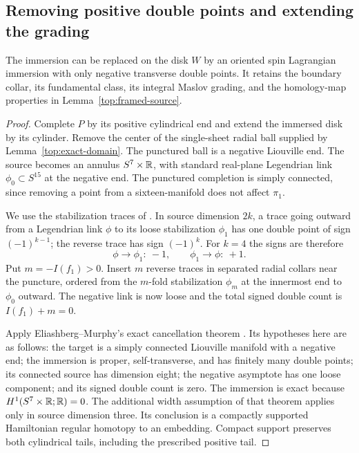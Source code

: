 \subsection{Removing positive double points and extending the grading}

\begin{lemma}\label{top:negative-doubles}
The immersion can be replaced on the disk $W$ by an oriented spin
Lagrangian immersion with only negative transverse double points.
It retains the boundary collar, its fundamental class, its integral
Maslov grading, and the homology-map properties in
Lemma~\ref{top:framed-source}.
\end{lemma}

\begin{proof}
Complete $P$ by its positive cylindrical end and extend the
immersed disk by its cylinder.  Remove the center of the
single-sheet radial ball supplied by Lemma~\ref{top:exact-domain}.
The punctured ball is a negative Liouville end.  The source
becomes an annulus $S^7\times\mathbb R$, with standard real-plane
Legendrian link $\phi_0\subset S^{15}$ at the negative end.
The punctured completion is simply connected, since removing
a point from a sixteen-manifold does not affect $\pi_1$.

We use the stabilization traces of
\cite[Lemma~3.2 and proof of Lemma~3.4]{eems}.  In source
dimension $2k$, a trace going outward from a Legendrian link
$\phi$ to its loose stabilization $\phi_1$ has one double
point of sign $(-1)^{k-1}$; the reverse trace has sign
$(-1)^k$.  For $k=4$ the signs are therefore
\begin{equation}\label{top:trace-signs}
 \phi\longrightarrow\phi_1:\ -1,
 \qquad \phi_1\longrightarrow\phi:\ +1.
\end{equation}
Put $m=-I(f_1)>0$.  Insert $m$ reverse traces in separated
radial collars near the puncture, ordered from the $m$-fold
stabilization $\phi_m$ at the innermost end to $\phi_0$
outward.  The negative link is now loose and the total signed
double count is $I(f_1)+m=0$.

Apply Eliashberg--Murphy's exact cancellation theorem
\cite[Theorem~2.3]{em-caps}.  Its hypotheses here are as
follows: the target is a simply connected Liouville manifold
with a negative end; the immersion is proper, self-transverse,
and has finitely many double points; its connected source has
dimension eight; the negative asymptote has one loose
component; and its signed double count is zero.  The
immersion is exact because $H^1(S^7\times\mathbb R;\mathbb R)=0$.
The additional width assumption of that theorem applies
only in source dimension three.  Its conclusion is a
compactly supported Hamiltonian regular homotopy to an
embedding.  Compact support preserves both cylindrical
tails, including the prescribed positive tail.


\end{proof}
